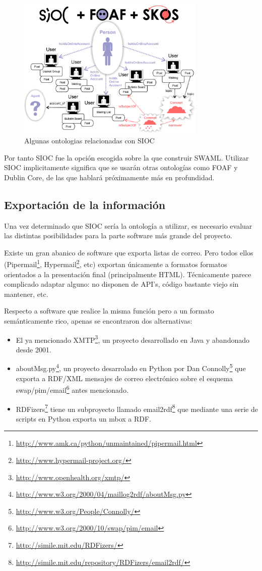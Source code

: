 \begin{figure}[H]
	\centering
	\includegraphics[width=9cm]{images/sioc-foaf-skos.png}
	\caption{Algunas ontologias relacionadas con SIOC}
	\label{fig:sioc+foaf+skos}
\end{figure}

Por tanto SIOC fue la opción escogida sobre la que construir SWAML. Utilizar SIOC
implicitamente significa que se usarán otras ontologías como FOAF y Dublin Core,
de las que hablará próximamente más en profundidad.


\subsection{Exportación de la información}

Una vez determinado que SIOC sería la ontología a utilizar, es necesario evaluar
las distintas posibilidades para la parte software más grande del proyecto.

Existe un gran abanico de software que exporta listas de correo. Pero todos
ellos (Pipermail\footnote{\url{http://www.amk.ca/python/unmaintained/pipermail.html}},
Hypermail\footnote{\url{http://www.hypermail-project.org/}}, etc) exportan únicamente
a formatos formatos orientados a la presentación final (principalmente HTML). 
Técnicamente parece complicado adaptar alguno: no disponen de API's, código bastante
viejo sin mantener, etc.

Respecto a software que realice la misma función pero a un formato semánticamente 
rico, apenas se encontraron dos alternativas:

\begin{itemize}
  \item El ya mencionado XMTP\footnote{\url{http://www.openhealth.org/xmtp/}}, un
	proyecto desarrollado en Java y abandonado desde 2001.
  \item aboutMsg.py\footnote{\url{http://www.w3.org/2000/04/maillog2rdf/aboutMsg.py}}, un
	proyecto desarrolado en Python por Dan Connolly\footnote{\url{http://www.w3.org/People/Connolly/}}
	que exporta a RDF/XML mensajes de correo electrónico sobre el esquema 
	swap/pim/email\footnote{\url{http://www.w3.org/2000/10/swap/pim/email}}
	antes mencionado.
  \item RDFizers\footnote{\url{http://simile.mit.edu/RDFizers/}} tiene un subproyecto
	llamado email2rdf\footnote{\url{http://simile.mit.edu/repository/RDFizers/email2rdf/}}
	que mediante una serie de scripts en Python exporta un mbox a RDF.
\end{itemize}

